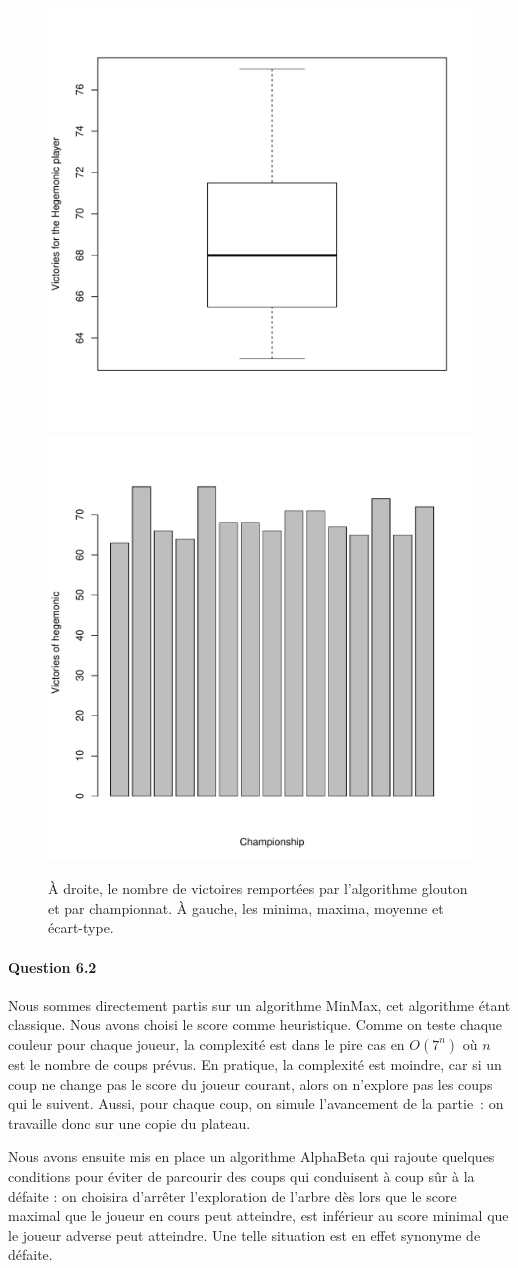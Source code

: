 \documentclass[a4paper]{article}
\begin{document}
\begin{figure}
\centering

\includegraphics[width=.45\columnwidth]{hegemon_vs_greedy}
\includegraphics[width=.45\columnwidth]{hegemon_vs_greedy_bar}

\caption{\label{hegemon_greedy} À droite, le nombre de victoires remportées par 
l'algorithme glouton et par championnat. À gauche, les minima, maxima, moyenne 
et écart-type.}
\end{figure}

    \paragraph{Question 6.2} Nous sommes directement partis sur un algorithme 
MinMax, cet algorithme étant classique. Nous avons choisi le score comme
    heuristique. Comme on teste chaque couleur pour chaque joueur, la complexité
    est dans le pire cas en $O(7^n)$ où $n$ est le nombre de coups prévus. En 
pratique, la complexité est moindre, car si un coup ne change pas le score du 
joueur courant, alors on n'explore pas les coups qui le suivent. 
Aussi, pour chaque coup, on simule l'avancement de la partie~: on travaille 
donc sur une copie du plateau. 

Nous avons ensuite mis en place un algorithme AlphaBeta qui rajoute quelques 
conditions pour éviter de parcourir des coups qui conduisent à coup sûr à la 
défaite : on choisira d'arrêter l'exploration de l'arbre dès lors que le score 
maximal que le joueur en cours peut atteindre, est inférieur au score minimal 
que le joueur adverse peut atteindre. Une telle situation est en effet synonyme 
de défaite.
\end{document}
